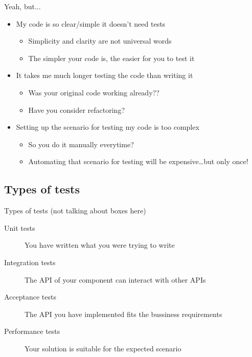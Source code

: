 \documentclass[pdf]{beamer}
\begin{document}
\begin{frame}{Yeah, but...}
    \begin{itemize}
    \item My code is so clear/simple it doesn't need tests
        \begin{itemize}
        \pause
        \item Simplicity and clarity are not universal words
        \pause
        \item The simpler your code is, the easier for you to test it
        \end{itemize}
    \pause
    \item It takes me much longer testing the code than writing it
        \begin{itemize}
        \pause
        \item Was your original code working already??
        \pause
        \item Have you consider refactoring?
        \end{itemize}
    \pause
    \item Setting up the scenario for testing my code is too complex
        \begin{itemize}
        \pause
        \item So you do it manually everytime?
        \pause
        \item Automating that scenario for testing will be expensive\dots but only once!
        \end{itemize}
    \end{itemize}
\end{frame}


\subsection*{Types of tests}
\label{types_of_tests}

\begin{frame}{Types of tests (not talking about boxes here)}
    \begin{description}
    \item [Unit tests] You have written what you were trying to write
    \pause
    \item [Integration tests] The API of your component can interact with other APIs
    \pause
    \item [Acceptance tests] The API you have implemented fits the bussiness requirements
    \pause
    \item [Performance tests] Your solution is suitable for the expected scenario
    \end{description}
\end{frame}
\end{document}
